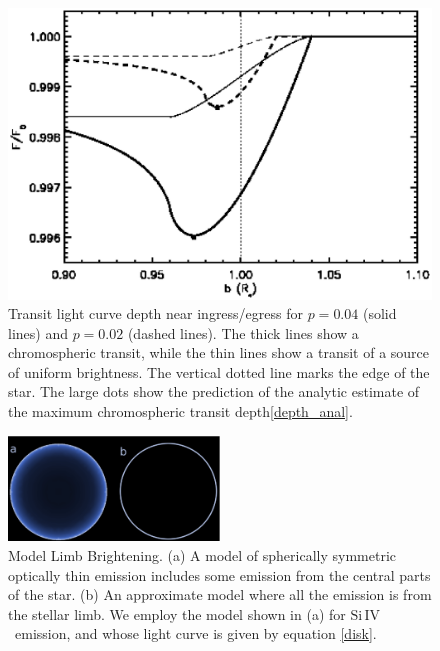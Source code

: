 \documentclass[manuscript]{aastex}
\newcommand{\siIV}{\ensuremath{\mathrm{Si}\,\scriptstyle \mathrm{IV}}}
\begin{document}

\begin{figure}
\includegraphics[width=0.5 \textwidth]{comp_size.eps}
\caption{Transit light curve depth near ingress/egress
for $p=0.04$ (solid lines) and $p=0.02$ (dashed lines).
The thick lines show a chromospheric transit, while the
thin lines show a transit of a source of uniform brightness.
The vertical dotted line marks the edge of the star.
The large dots show the prediction of the analytic
estimate of the maximum chromospheric transit depth\ref{depth_anal}.}
\label{fig02}
\end{figure}


\begin{figure}
\begin{center}
\includegraphics[width=0.5\textwidth]{model_comparison.eps}
\caption{Model Limb Brightening. (a) A model of spherically symmetric optically thin emission includes some emission from the central parts of the star. (b) An approximate model where all the emission is from the stellar limb. We employ the model shown in (a) for \siIV\ emission, and whose light curve is given by  equation \ref{disk}.}
\label{limbmodel}
\end{center}
\end{figure}
\end{document}
